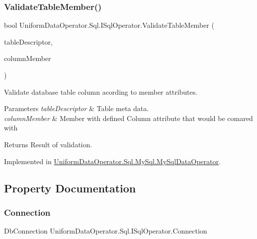 \subsubsection{\texorpdfstring{Validate\+Table\+Member()}{ValidateTableMember()}}
{\footnotesize\ttfamily bool Uniform\+Data\+Operator.\+Sql.\+I\+Sql\+Operator.\+Validate\+Table\+Member (\begin{DoxyParamCaption}\item[{\mbox{\hyperlink{class_uniform_data_operator_1_1_sql_1_1_markup_1_1_table_attribute}{Table\+Attribute}}}]{table\+Descriptor,  }\item[{Member\+Info}]{column\+Member }\end{DoxyParamCaption})}



Validate database table column acording to member attributes. 


\begin{DoxyParams}{Parameters}
{\em table\+Descriptor} & Table meta data.\\
\hline
{\em column\+Member} & Member with defined Column attribute that would be comared with \\
\hline
\end{DoxyParams}
\begin{DoxyReturn}{Returns}
Result of validation.
\end{DoxyReturn}


Implemented in \mbox{\hyperlink{class_uniform_data_operator_1_1_sql_1_1_my_sql_1_1_my_sql_data_operator_a3c1a7ceec19175ba5bbce8109565be05}{Uniform\+Data\+Operator.\+Sql.\+My\+Sql.\+My\+Sql\+Data\+Operator}}.



\subsection{Property Documentation}
\mbox{\label{interface_uniform_data_operator_1_1_sql_1_1_i_sql_operator_a99f034a986828e96955e3187cdfb28da}} 
\subsubsection{\texorpdfstring{Connection}{Connection}}
{\footnotesize\ttfamily Db\+Connection Uniform\+Data\+Operator.\+Sql.\+I\+Sql\+Operator.\+Connection\hspace{0.3cm}{\ttfamily [get]}}



